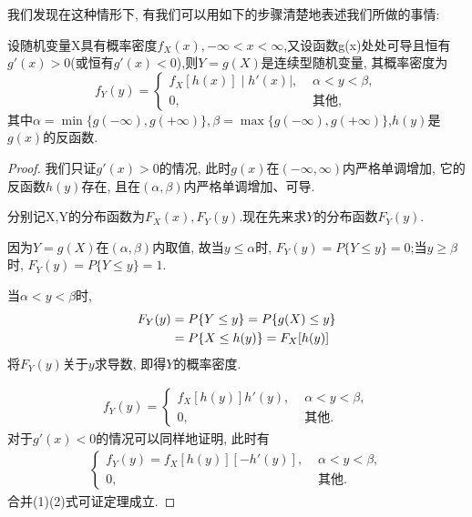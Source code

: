 我们发现在这种情形下, 有我们可以用如下的步骤清楚地表述我们所做的事情: 

\begin{theorem}
  设随机变量X具有概率密度$f_X(x),-\infty < x < \infty$,又设函数g(x)处处可导且恒有$g'(x)>0$(或恒有$g'(x)<0$),则$Y = g(X)$是连续型随机变量, 其概率密度为
  \begin{equation*}
      f_Y(y)=
      \begin{cases}
          \displaystyle f_X[h(x)]\mid h'(x)\mid,\,\, &\alpha<y<\beta,\\
          \displaystyle 0,\,\, &\text{其他},
      \end{cases}
  \end{equation*}
  其中$\alpha = \min\{g(-\infty),g(+\infty)\},\beta = \max\{g(-\infty),g(+\infty)\}$,$h(y)$是$g(x)$的反函数.
\end{theorem}

\begin{proof}
  我们只证$g'(x)>0$的情况, 此时$g(x)$在$(-\infty,\infty)$内严格单调增加, 它的反函数$h(y)$存在, 且在$(\alpha,\beta)$内严格单调增加、可导.
    
分别记X,Y的分布函数为$F_X(x),F_Y(y)$.现在先来求$Y$的分布函数$F_Y(y)$.
 
因为$Y = g(X)$在$(\alpha,\beta)$内取值, 故当$y \leq \alpha$时, $F_Y(y) = P\{Y \leq y\} = 0$;当$y \geq \beta$时, $F_Y(y) = P\{Y \leq y\} = 1$.
 
 当$\alpha < y < \beta$时, 
 $$
 \begin{aligned}
     \small F_Y(y) &= P\{Y \leq y\} = P\{g(X) \leq y\}\\
     \small &= P\{X \leq h(y)\} = F_X[h(y)]
 \end{aligned}
$$
将$F_Y(y)$关于$y$求导数, 即得$Y$的概率密度.

\begin{align}
  f_Y(y) =
  \begin{cases}
      \displaystyle f_X[h(y)]h'(y),\,\,  &\alpha < y < \beta,\\
      \displaystyle 0,\,\,  &\text{其他}.
  \end{cases}
\end{align}
对于$g'(x)<0$的情况可以同样地证明, 此时有
\begin{align}
  \begin{cases}
      f_Y(y)=
      \displaystyle f_X[h(y)][-h'(y)],\,\, &\alpha < y < \beta,\\
      \displaystyle 0,\,\, &\text{其他}.
  \end{cases}
\end{align}
合并(1)(2)式可证定理成立.
\end{proof}

